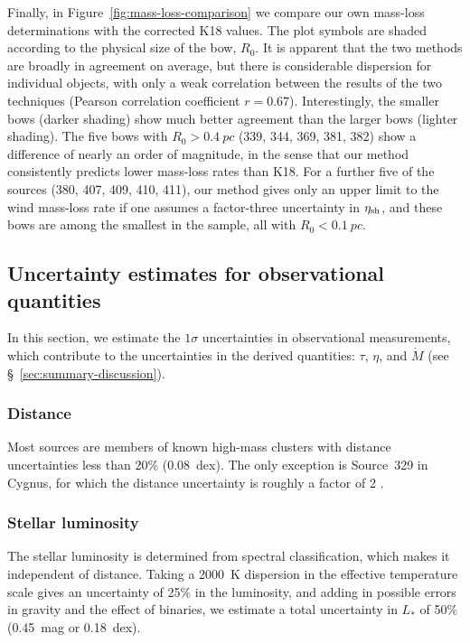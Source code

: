 Finally, in Figure~\ref{fig:mass-loss-comparison} we compare our own
mass-loss determinations with the corrected K18 values.  The plot
symbols are shaded according to the physical size of the bow, \(R_0\).
It is apparent that the two methods are broadly in agreement on
average, but there is considerable dispersion for individual objects,
with only a weak correlation between the results of the two techniques
(Pearson correlation coefficient \(r = 0.67\)).  Interestingly, the
smaller bows (darker shading) show much better agreement than the
larger bows (lighter shading).  The five bows with
\(R_0 > \SI{0.4}{pc}\) (339, 344, 369, 381, 382) show a difference of
nearly an order of magnitude, in the sense that our method
consistently predicts lower mass-loss rates than K18.  For a further
five of the sources (380, 407, 409, 410, 411), our method gives only
an upper limit to the wind mass-loss rate if one assumes a
factor-three uncertainty in \(\eta_{\text{sh}}\), and these bows are among
the smallest in the sample, all with \(R_0 < \SI{0.1}{pc}\).

\subsection{Uncertainty estimates for observational quantities}
\label{sec:uncert-estim-observ}

In this section, we estimate the \(1\sigma\) uncertainties in
observational measurements, which contribute to the uncertainties in
the derived quantities: \(\tau\), \(\eta\), and \(\dot M\) (see
\S~\ref{sec:summary-discussion}).

\subsubsection{Distance}
\label{sec:distance}

Most sources are members of known high-mass clusters with distance
uncertainties less than 20\% (0.08~dex). The only exception is
Source~329 in Cygnus, for which the distance uncertainty is roughly a
factor of 2 \citep{Kobulnicky:2018a}.

\subsubsection{Stellar luminosity}
\label{sec:stellar-luminosity}

The stellar luminosity is determined from spectral classification,
which makes it independent of distance.  Taking a \SI{2000}{K}
dispersion in the effective temperature scale \citep{Martins:2005a}
gives an uncertainty of 25\% in the luminosity, and adding in possible
errors in gravity and the effect of binaries, we estimate a total
uncertainty in \(L_*\) of 50\% (0.45~mag or 0.18~dex).

